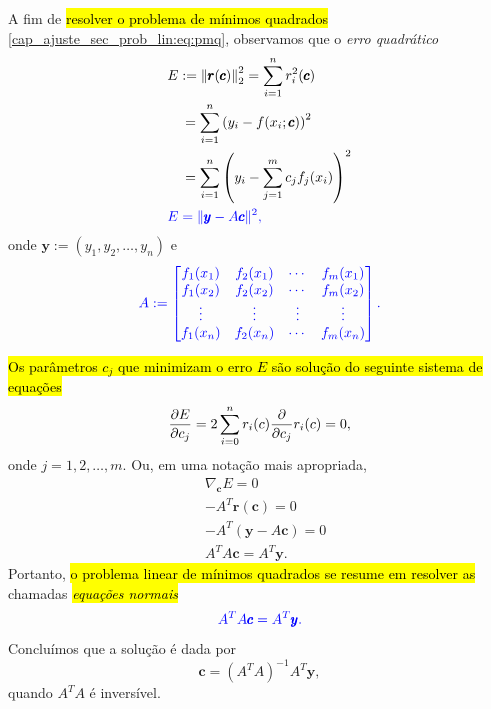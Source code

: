 A fim de \hl{resolver o problema de mínimos quadrados} \eqref{cap_ajuste_sec_prob_lin:eq:pmq}, observamos que o \emph{erro quadrático}
\begin{align}
  & E := \left\|\pmb{r}(\pmb{c})\right\|_2^2 = \sum_{i=1}^n r_i^2(\pmb{c}) \\
  & \text{}\quad = \sum_{i=1}^n \left(y_i - f(x_i; \pmb{c})\right)^2 \\
  & \text{}\quad = \sum_{i=1}^n \left(y_i - \sum_{j=1}^m c_jf_j(x_i)\right)^2 \\
  & \color{blue}E = \|\pmb{y} - A\pmb{c}\|^2,
\end{align}
onde $\pmb{y} := (y_1, y_2, \dotsc, y_n)$ e
\begin{equation}\color{blue}A :=
  \begin{bmatrix}
    f_1(x_1) & f_2(x_1) & \cdots & f_m(x_1) \\
    f_1(x_2) & f_2(x_2) & \cdots & f_m(x_2) \\
    \vdots & \vdots & \vdots & \vdots \\
    f_1(x_n) & f_2(x_n) & \cdots & f_m(x_n)
  \end{bmatrix}.
\end{equation}

\hl{Os parâmetros $c_j$ que minimizam o erro $E$ são solução do seguinte sistema de equações}
\begin{equation}
  \frac{\partial E}{\partial c_j} = 2\sum_{i=0}^n r_i(c)\frac{\partial}{\partial c_j}r_i(c) = 0,
\end{equation}
onde $j=1, 2, \dotsc, m$. Ou, em uma notação mais apropriada,
\begin{align}
  & \nabla_{\pmb{c}} E = 0\\
  & -A^T\pmb{r}(\pmb{c}) = 0\\
  & -A^T(\pmb{y} - A\pmb{c}) = 0\\
  & A^TA\pmb{c} = A^T\pmb{y}.
\end{align}
Portanto, \hl{o problema linear de mínimos quadrados se resume em resolver as} chamadas \hl{\emph{equações normais}}
\begin{equation}\label{cap_ajuste_sec_prob_lin:eq:equacoes_normais}\color{blue}A^TA\pmb{c}= A^T\pmb{y}.
\end{equation}
Concluímos que a solução é dada por
\begin{equation}
  \pmb{c} = \left(A^TA\right)^{-1}A^T\pmb{y},
\end{equation}
quando $A^TA$ é inversível.

